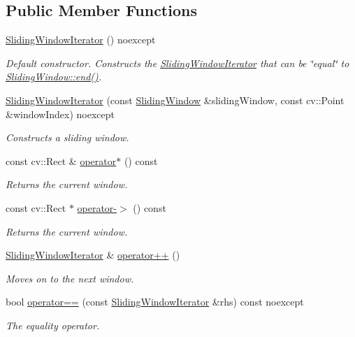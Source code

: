 \subsection*{Public Member Functions}
\begin{DoxyCompactItemize}
\item 
\hyperlink{group___imagery_module_gaa72789bec6d0d49fe87408e224739d23}{Sliding\+Window\+Iterator} () noexcept
\begin{DoxyCompactList}\small\item\em Default constructor. Constructs the \hyperlink{classdg_1_1deepcore_1_1imagery_1_1_sliding_window_iterator}{Sliding\+Window\+Iterator} that can be \char`\"{}equal\char`\"{} to \hyperlink{group___imagery_module_ga1c962ee19d65114b9213d2aea33503a6}{Sliding\+Window\+::end()}. \end{DoxyCompactList}\item 
\hyperlink{group___imagery_module_ga7493aa55008e090f05fcb47bd53d6098}{Sliding\+Window\+Iterator} (const \hyperlink{classdg_1_1deepcore_1_1imagery_1_1_sliding_window}{Sliding\+Window} \&sliding\+Window, const cv\+::\+Point \&window\+Index) noexcept
\begin{DoxyCompactList}\small\item\em Constructs a sliding window. \end{DoxyCompactList}\item 
const cv\+::\+Rect \& \hyperlink{group___imagery_module_gac4ebab49e1019b197708fa07ddf8a550}{operator$\ast$} () const 
\begin{DoxyCompactList}\small\item\em Returns the current window. \end{DoxyCompactList}\item 
const cv\+::\+Rect $\ast$ \hyperlink{group___imagery_module_ga72f982e7452565b8b39edcfd3e81e2b8}{operator-\/$>$} () const 
\begin{DoxyCompactList}\small\item\em Returns the current window. \end{DoxyCompactList}\item 
\hyperlink{classdg_1_1deepcore_1_1imagery_1_1_sliding_window_iterator}{Sliding\+Window\+Iterator} \& \hyperlink{group___imagery_module_ga7b899de397aefb4987bcb989f3cb33d4}{operator++} ()
\begin{DoxyCompactList}\small\item\em Moves on to the next window. \end{DoxyCompactList}\item 
bool \hyperlink{group___imagery_module_gaf2d1d266e7176885e054f28bbdec7c61}{operator==} (const \hyperlink{classdg_1_1deepcore_1_1imagery_1_1_sliding_window_iterator}{Sliding\+Window\+Iterator} \&rhs) const noexcept
\begin{DoxyCompactList}\small\item\em The equality operator. \end{DoxyCompactList}\end{DoxyCompactItemize}
